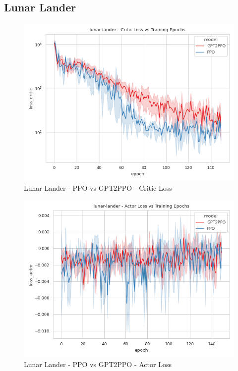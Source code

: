 \subsection{Lunar Lander}

\begin{figure}[htbp]
    \centerline{\includegraphics[width=\columnwidth]{./img/lunar-lander-loss_critic-model.png}}
    \caption{Lunar Lander - PPO vs GPT2PPO - Critic Loss}
    \label{lunar-lander-loss_critic-model}
\end{figure}

\begin{figure}[htbp]
    \centerline{\includegraphics[width=\columnwidth]{./img/lunar-lander-loss_actor-model.png}}
    \caption{Lunar Lander - PPO vs GPT2PPO - Actor Loss}
    \label{lunar-lander-loss_actor-model}
\end{figure}

